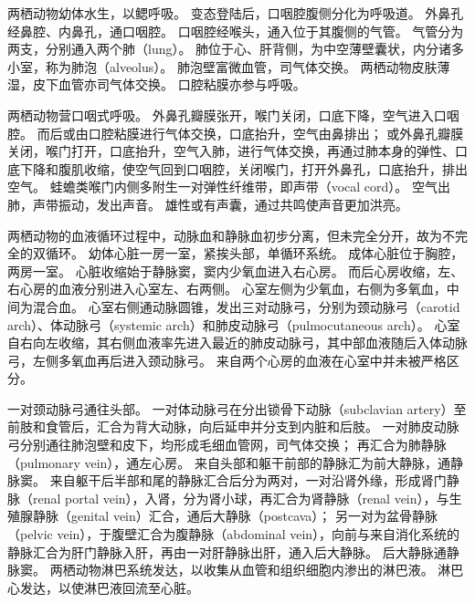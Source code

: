 \documentclass[11pt]{article}
\begin{document}
\newline

两栖动物幼体水生，以鳃呼吸。
变态登陆后，口咽腔腹侧分化为呼吸道。
外鼻孔经鼻腔、内鼻孔，通口咽腔。
口咽腔经喉头，通入位于其腹侧的气管。
气管分为两支，分别通入两个肺（lung）。
肺位于心、肝背侧，为中空薄壁囊状，内分诸多小室，称为肺泡（alveolus）。
肺泡壁富微血管，司气体交换。
两栖动物皮肤薄湿，皮下血管亦司气体交换。
口腔粘膜亦参与呼吸。

\newline

两栖动物营口咽式呼吸。
外鼻孔瓣膜张开，喉门关闭，口底下降，空气进入口咽腔。
而后或由口腔粘膜进行气体交换，口底抬升，空气由鼻排出；
或外鼻孔瓣膜关闭，喉门打开，口底抬升，空气入肺，进行气体交换，再通过肺本身的弹性、口底下降和腹肌收缩，使空气回到口咽腔，关闭喉门，打开外鼻孔，口底抬升，排出空气。
蛙蟾类喉门内侧多附生一对弹性纤维带，即声带（vocal cord）。
空气出肺，声带振动，发出声音。
雄性或有声囊，通过共鸣使声音更加洪亮。

\newline

两栖动物的血液循环过程中，动脉血和静脉血初步分离，但未完全分开，故为不完全的双循环。
幼体心脏一房一室，紧挨头部，单循环系统。
成体心脏位于胸腔，两房一室。
心脏收缩始于静脉窦，窦内少氧血进入右心房。
而后心房收缩，左、右心房的血液分别进入心室左、右两侧。
心室左侧为少氧血，右侧为多氧血，中间为混合血。
心室右侧通动脉圆锥，发出三对动脉弓，分别为颈动脉弓（carotid arch）、体动脉弓（systemic arch）和肺皮动脉弓（pulmocutaneous arch）。
心室自右向左收缩，其右侧血液率先进入最近的肺皮动脉弓，其中部血液随后入体动脉弓，左侧多氧血再后进入颈动脉弓。
来自两个心房的血液在心室中并未被严格区分。

\newline

一对颈动脉弓通往头部。
一对体动脉弓在分出锁骨下动脉（subclavian artery）至前肢和食管后，汇合为背大动脉，向后延申并分支到内脏和后肢。
一对肺皮动脉弓分别通往肺泡壁和皮下，均形成毛细血管网，司气体交换；
再汇合为肺静脉（pulmonary vein），通左心房。
来自头部和躯干前部的静脉汇为前大静脉，通静脉窦。
来自躯干后半部和尾的静脉汇合后分为两对，一对沿肾外缘，形成肾门静脉（renal portal vein），入肾，分为肾小球，再汇合为肾静脉（renal vein），与生殖腺静脉（genital vein）汇合，通后大静脉（postcava）；
另一对为盆骨静脉（pelvic vein），于腹壁汇合为腹静脉（abdominal vein），向前与来自消化系统的静脉汇合为肝门静脉入肝，再由一对肝静脉出肝，通入后大静脉。
后大静脉通静脉窦。
两栖动物淋巴系统发达，以收集从血管和组织细胞内渗出的淋巴液。
淋巴心发达，以使淋巴液回流至心脏。
\end{document}
